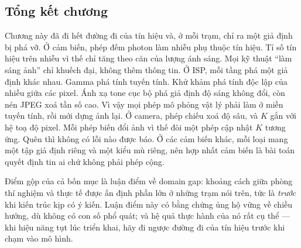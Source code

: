 \documentclass[../../deep_learning.tex]{subfiles}
\begin{document}
\subsection*{Tổng kết chương}
Chương này đã đi hết đường đi của tín hiệu và, ở mỗi trạm, chỉ ra một giả định bị phá vỡ. Ở cảm biến, phép đếm photon làm nhiễu phụ thuộc tín hiệu. Tỉ số tín hiệu trên nhiễu vì thế chỉ tăng theo căn của lượng ánh sáng. Mọi kỹ thuật ``làm sáng ảnh'' chỉ khuếch đại, không thêm thông tin. Ở ISP, mỗi tầng phá một giả định khác nhau. Gamma phá tính tuyến tính. Khử khảm phá tính độc lập của nhiễu giữa các pixel. Ánh xạ tone cục bộ phá giả định độ sáng không đổi, còn nén JPEG xoá tần số cao. Vì vậy mọi phép mô phỏng vật lý phải làm ở miền tuyến tính, rồi mới dựng ảnh lại. Ở camera, phép chiếu xoá độ sâu, và \(K\) gắn với hệ toạ độ pixel. Mỗi phép biến đổi ảnh vì thế đòi một phép cập nhật \(K\) tương ứng. Quên thì không có lỗi nào được báo. Ở các cảm biến khác, mỗi loại mang một tập giả định riêng và một kiểu mù riêng, nên hợp nhất cảm biến là bài toán quyết định tin ai chứ không phải phép cộng.

Điểm gộp của cả bốn mục là luận điểm về domain gap: khoảng cách giữa phòng thí nghiệm và thực tế được ấn định phần lớn ở những trạm nói trên, tức là \emph{trước} khi kiến trúc kịp có ý kiến. Luận điểm này có bằng chứng ủng hộ vững về chiều hướng, dù không có con số phổ quát; và hệ quả thực hành của nó rất cụ thể --- khi hiệu năng tụt lúc triển khai, hãy đi ngược đường đi của tín hiệu trước khi chạm vào mô hình.
\end{document}

